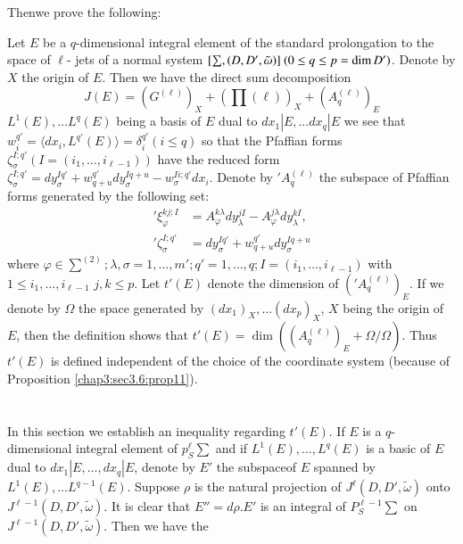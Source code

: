 Then\pageoriginale we prove the following:
\begin{proposition}\label{chap3:sec3.6:prop11}%
  Let $E$ be a $q$-dimensional integral element of the standard
  prolongation to the space of $\ell$- jets of a normal system $[\sum,
    (D,\break D', \tilde{\omega})]~ (0 \leq q \leq p = \dim D')$. Denote by
  $X$ the origin of $E$. Then we have the direct sum decomposition 
  $$
  J(E) = \left(G^{(\ell)}\right)_X + \left(\prod (\ell)\right)_X +
  \left(A_q^{(\ell)}\right)_E 
  $$
  $L^1 (E) , \ldots L^q (E)$ being a basis of $E$ dual to $dx_1 |E,
  \ldots dx_q | E$ we see that $w_i ^{q'} = \langle dx_i, L^{q'} (E)
  \rangle = \delta ^{q'}_i (i \leq q)$ so that the Pfaffian forms
  $\zeta_{\sigma}^{I;q'}(I = (i_1, \ldots, i_{\ell -1}))$ have the
  reduced form $\zeta_{\sigma}^{I;q'} = dy_{\sigma}^{Iq'} +
  w_{q+u}^{q'} dy_{\sigma}^{Iq +u} - w_{\sigma}^{Ii; q'} dx_i$. Denote
  by $'A_q^{(\ell)}$ the subspace of Pfaffian forms generated by the
  following set:  
  \begin{align*}
    '\xi_{\varphi}^{kj ; I} & = A_{\varphi}^{k \lambda}
    dy_{\lambda}^{jI} - A_{\varphi}^{j \lambda}dy_{\lambda}^{kI},\\ 
    '\zeta_{\sigma}^{I; q'} &= dy_{\sigma}^{Iq'} + w_{q+u}^{q'}dy_{\sigma}^{I q+u}
  \end{align*}
  where $\varphi \in \sum^{(2)}; \lambda , \sigma = 1 ,\ldots , m';
  q'=1, \ldots , q; I
  = (i_1, \ldots , i _{\ell -1})$ with $1 \leq i_1, \ldots , i_{\ell -1}$
  $j,k \leq p$. Let $t'(E)$ denote the dimension of
  $('A^{(\ell)}_q)_E$. If we denote by $\Omega$ the space generated by
  $(dx_1)_X, \ldots (dx_p)_X$, $X$ being the origin of $E$, then the
  definition shows that $t' (E) = \dim ((A_q^{(\ell)})_E + \Omega/
  \Omega)$. Thus $t'(E)$ is defined independent of the choice of the
  coordinate system (because of Proposition \ref{chap3:sec3.6:prop11}).  
\end{proposition}

\setcounter{section}{7}
\section{}\label{chap3:sec3.8}%

In this section we establish an inequality regarding $t'(E)$. If $E$
is a $q$-dimensional integral element of $p_S^{\ell} \sum$ and if $L^1
(E), \ldots, L^q (E)$ is a basic of $E$ dual to $dx_1 |E, \ldots ,
dx_q|E$, denote by $E'$ the subspace\pageoriginale of $E$ spanned by $L^1 (E),
\ldots L^{q-1} (E)$. Suppose $\rho$ is the natural projection of
$J^\ell (D,D', \tilde{\omega})$ onto $J^{\ell -1} (D,D',
\tilde{\omega})$. It is clear that $E'' = d \rho .E'$ is an integral of
$P_S^{\ell -1} \sum$ on $J^{\ell -1} (D,D', \tilde{\omega})$. Then we
have the  

